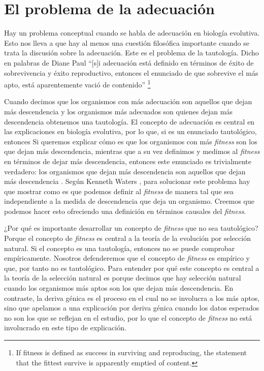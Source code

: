 
\chapter{El problema de la adecuación}

\noindent Hay un problema conceptual cuando se habla de adecuación en biología evolutiva. Esto nos lleva a que hay al menos una cuestión filosófica importante cuando se trata la discusión sobre la adecuación. Este es el problema de la tautología. Dicho en palabras de Diane Paul ``[s]i adecuación está definido en términos de éxito de sobrevivencia y éxito reproductivo, entonces el enunciado de que sobrevive el más apto, está aparentemente vació de contenido'' \footnote{If fitness is defined as success in surviving and reproducing, the statement that the fittest survive is apparently emptied of content.} \citeyear{Paul1992}

Cuando decimos que los organismos con más adecuación son aquellos que dejan más descendencia y los organismos más adecuados son quienes dejan más descendencia obtenemos una tautología. El concepto de adecuación es central en las explicaciones en biología evolutiva, por lo que, si es un enunciado tautológico, entonces Si queremos explicar cómo es que los organismos con más \emph{fitness} son los que dejan más descendencia, mientras que a su vez definimos y medimos al \emph{fitness} en términos de dejar más descendencia, entonces este enunciado es trivialmente verdadero: los organismos que dejan más descendencia son aquellos que dejan más descendencia \cite{Bouchard2004}. Según Kenneth Waters \citeyear{Waters1986}, para solucionar este problema hay que mostrar como es que podemos definir al \emph{fitness} de manera tal que sea independiente a la medida de descendencia que deja un organismo. Creemos que podemos hacer esto ofreciendo una definición en términos causales del \emph{fitness}.

¿Por qué es importante desarrollar un concepto de \emph{fitness} que no sea tautológico? Porque el concepto de \emph{fitness} es central a la teoría de la evolución por selección natural. Si el concepto es una tautología, entonces no se puede comprobar empíricamente. Nosotros defenderemos que el concepto de \emph{fitness} es empírico y que, por tanto no es tautológico. Para entender por qué este concepto es central a la teoría de la selección natural es porque decimos que hay selección natural cuando los organismos más aptos son los que dejan más descendencia. En contraste, la deriva génica es el proceso en el cual no se involucra a los más aptos, sino que apelamos a una explicación por deriva génica cuando los datos esperados no son los que se reflejan en el estudio, por lo que el concepto de \emph{fitness} no está involucrado en este tipo de explicación.

